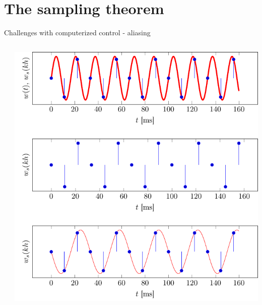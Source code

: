 \documentclass[presentation,aspectratio=169]{beamer}
\begin{document}
\section{The sampling theorem}
\label{sec:org1a7350f}
\begin{frame}[label={sec:org669fc95}]{Challenges with computerized control - aliasing}
\begin{columns}
\begin{column}{0.6\columnwidth}
\begin{center}
\end{center}
\end{column}
\begin{column}{0.4\columnwidth}
\includegraphics[width=0.99\linewidth]{../../figures/aliasing-example-60Hz}
\end{column}
\end{columns}
\end{frame}
\end{document}
